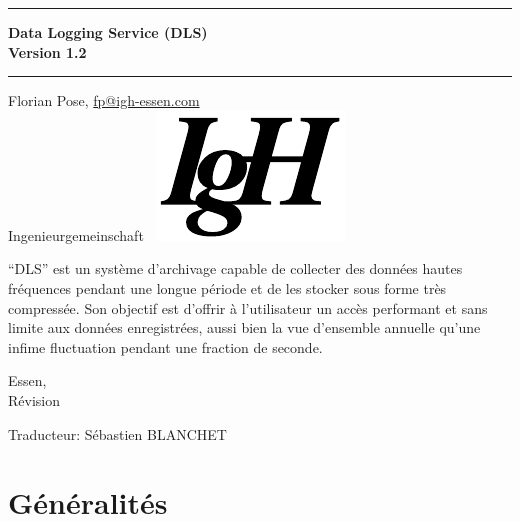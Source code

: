 \documentclass[a4paper,12pt,BCOR6mm,bibtotoc,idxtotoc]{scrbook}
\newcommand{\IgH}{\raisebox{-0.7667ex}\
    {\includegraphics[height=2.2ex]{bilder/ighsign}}}
\begin{document}


 \pagestyle{empty}

\begin{titlepage} \begin{center} \rule{\textwidth}{1.5mm}

{\Huge\bf Data Logging Service (DLS)\\[1ex] Version 1.2}

\vspace{1ex}

\rule{\textwidth}{1.5mm}

\vspace{\fill}

{\Large Florian Pose, \url{fp@igh-essen.com}\\[1ex]
    Ingenieurgemeinschaft \IgH}

\vspace{\fill}

``DLS'' est un syst\`eme d'archivage capable de collecter des
donn\'ees hautes fr\'equences pendant une longue p\'eriode et de les
stocker sous forme tr\`es compress\'ee.  Son objectif est d'offrir
\`a l'utilisateur un acc\`es performant et sans limite aux donn\'ees
enregistr\'ees, aussi bien la vue d'ensemble annuelle qu'une infime
fluctuation pendant une fraction de seconde.

\vspace{\fill}

{\large Essen, \rcsInfoLongDate\\[1ex] R\'evision \rcsInfoRevision}

{\large Traducteur: S\'ebastien BLANCHET}

\end{center}
\end{titlepage}



\pagestyle{scrheadings}

\tableofcontents



\chapter{G\'en\'eralit\'es}
\label{sec:allg}
\end{document}
